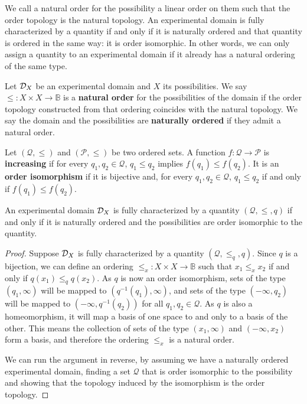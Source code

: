 We call a natural order for the possibility a linear order on them such that the order topology is the natural topology. An experimental domain is fully characterized by a quantity if and only if it is naturally ordered and that quantity is ordered in the same way: it is order isomorphic. In other words, we can only assign a quantity to an experimental domain if it already has a natural ordering of the same type.

\begin{mathSection}
	\begin{defn}
		Let $\mathcal{D}_X$ be an experimental domain and $X$ its possibilities. We say $\leq : X \times X \to \mathbb{B}$ is a \textbf{natural order} for the possibilities of the domain if the order topology constructed from that ordering coincides with the natural topology. We say the domain and the possibilities are \textbf{naturally ordered} if they admit a natural order.
	\end{defn}
	\begin{defn}
		Let $(\mathcal{Q}, \leq)$ and $(\mathcal{P}, \leq)$ be two ordered sets. A function $f : \mathcal{Q} \to \mathcal{P}$ is \textbf{increasing} if for every $q_1, q_2 \in \mathcal{Q}$, $q_1 \leq q_2$ implies $f(q_1) \leq f(q_2)$. It is an \textbf{order isomorphism} if it is bijective and, for every $q_1, q_2 \in \mathcal{Q}$, $q_1 \leq q_2$ if and only if $f(q_1) \leq f(q_2)$.
	\end{defn}
	
	\begin{thrm}\label{pm-pq-propertyOrdering}
		An experimental domain $\mathcal{D}_X$ is fully characterized by a quantity $(\mathcal{Q}, \leq, q)$ if and only if it is naturally ordered and the possibilities are order isomorphic to the quantity.
	\end{thrm}
	\begin{proof}
		Suppose $\mathcal{D}_X$ is fully characterized by a quantity $(\mathcal{Q}, \leq_q, q)$. Since $q$ is a bijection, we can define an ordering $\leq_x : X \times X \to \mathbb{B}$ such that $x_1 \leq_x x_2$ if and only if $q(x_1) \leq_q q(x_2)$. As $q$ is now an order isomorphism, sets of the type $(q_1, \infty)$ will be mapped to $(q^{-1}(q_1), \infty)$, and sets of the type $(-\infty, q_2)$ will be mapped to $(-\infty, q^{-1}(q_2))$ for all $q_1, q_2 \in \mathcal{Q}$. As $q$ is also a homeomorphism, it will map a basis of one space to and only to a basis of the other. This means the collection of sets of the type $(x_1, \infty)$ and $(-\infty, x_2)$ form a basis, and therefore the ordering $\leq_x$ is a natural order.
		
		We can run the argument in reverse, by assuming we have a naturally ordered experimental domain, finding  a set $\mathcal{Q}$ that is order isomorphic to the possibility and showing that the topology induced by the isomorphism is the order topology.
	\end{proof}
\end{mathSection}

